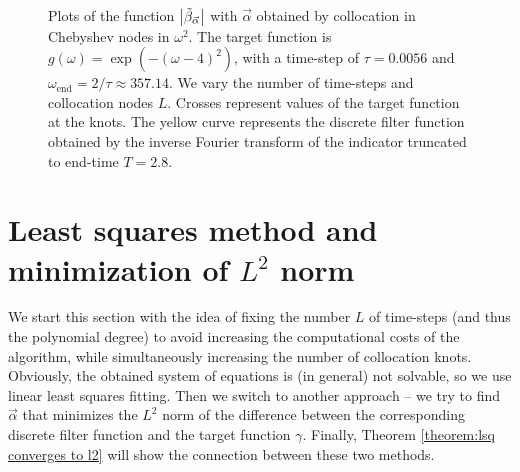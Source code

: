 \documentclass[a4paper,11pt,bibliography=totoc,listof=totoc,headinclude=true,cleardoublepage=empty,oneside]{scrbook}
\newcommand{\dffv}{\Tilde{\beta}_{\Vec{\alpha}}}
\newcommand{\e}{\mathrm{end}}
\begin{document}
\begin{figure}[h]
    \caption{Plots of the function $\left|\dffv\right|$ with $\Vec{\alpha}$ obtained by collocation in Chebyshev nodes in $\omega^2$. The target function is $g(\omega) = \exp\left(-(\omega-4)^2\right)$, with a time-step of $\tau = 0.0056$ and $\omega_\e = 2/\tau \approx 357.14$. We vary the number of time-steps and collocation nodes $L$. Crosses represent values of the target function at the knots. The yellow curve represents the discrete filter function obtained by the inverse Fourier transform of the indicator truncated to end-time $T=2.8$.}
    \label{fig:cheb coll cont ex}
\end{figure}


\section{Least squares method and minimization of $L^2$ norm}\label{section:lsq l2}
We start this section with the idea of fixing the number $L$ of time-steps (and thus the polynomial degree) to avoid increasing the computational costs of the algorithm, while simultaneously increasing the number of collocation knots. Obviously, the obtained system of equations is (in general) not solvable, so we use linear least squares fitting. Then we switch to another approach -- we try to find $\Vec{\alpha}$ that minimizes the $L^2$ norm of the difference between the corresponding discrete filter function and the target function $\gamma$. Finally, Theorem \ref{theorem:lsq converges to l2} will show the connection between these two methods.
\end{document}
